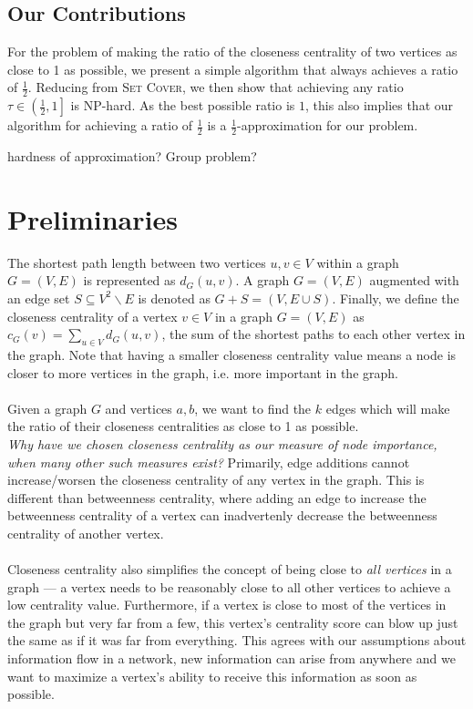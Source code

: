 \subsection{Our Contributions}
For the problem of making the ratio of the closeness centrality of two vertices as close to 1 as possible, we present a simple algorithm that always achieves a ratio of $\frac{1}{2}$. Reducing from \textsc{Set Cover}, we then show that achieving any ratio $\tau\in\left(\frac{1}{2},1\right]$ is NP-hard. As the best possible ratio is $1$, this also implies that our algorithm for achieving a ratio of $\frac{1}{2}$ is a $\frac{1}{2}$-approximation for our problem.

hardness of approximation? Group problem?



\section{Preliminaries}
The shortest path length between two vertices $u,v\in V$ within a graph $G=(V,E)$ is represented as $d_G(u,v)$. A graph $G=(V,E)$ augmented with an edge set $S\subseteq V^2\backslash E$ is denoted as $G+S=(V,E\cup S)$. Finally, we define the closeness centrality of a vertex $v\in V$ in a graph $G=(V,E)$ as $c_G(v)=\sum_{u\in V}d_G(u,v)$, the sum of the shortest paths to each other vertex in the graph. Note that having a smaller closeness centrality value means a node is closer to more vertices in the graph, i.e. more important in the graph.\\\\
Given a graph $G$ and vertices $a,b$, we want to find the $k$ edges which will make the ratio of their closeness centralities as close to 1 as possible.\\
\emph{Why have we chosen closeness centrality as our measure of node importance, when many other such measures exist?} 
Primarily, edge additions cannot increase/worsen the closeness centrality of any vertex in the graph. This is different than betweenness centrality, where adding an edge to increase the betweenness centrality of a vertex can inadvertenly decrease the betweenness centrality of another vertex. \\\\
Closeness centrality also simplifies the concept of being close to \textit{all vertices} in a graph --- a vertex needs to be reasonably close to all other vertices to achieve a low centrality value. Furthermore, if a vertex is close to most of the vertices in the graph but very far from a few, this vertex's centrality score can blow up just the same as if it was far from everything. This agrees with our assumptions about information flow in a network, new information can arise from anywhere and we want to maximize a vertex's ability to receive this information as soon as possible.\\\\